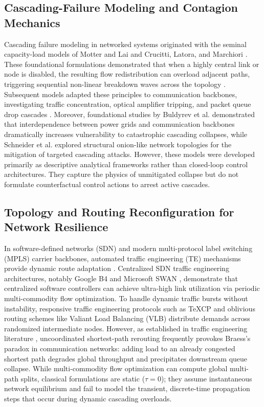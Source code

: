 \documentclass[pdflatex,sn-mathphys-num]{sn-jnl}
\theoremstyle{thmstyleone}
\theoremstyle{thmstyletwo}
\theoremstyle{thmstylethree}
\begin{document}
\subsection{Cascading-Failure Modeling and Contagion Mechanics}
Cascading failure modeling in networked systems originated with the seminal capacity-load models of Motter and Lai \cite{motter2002cascade} and Crucitti, Latora, and Marchiori \cite{crucitti2004model}. These foundational formulations demonstrated that when a highly central link or node is disabled, the resulting flow redistribution can overload adjacent paths, triggering sequential non-linear breakdown waves across the topology \cite{dobson2007complex,cuadra2015critical}. Subsequent models adapted these principles to communication backbones, investigating traffic concentration, optical amplifier tripping, and packet queue drop cascades \cite{albert2000error}. Moreover, foundational studies by Buldyrev et al. \cite{buldyrev2010catastrophic} demonstrated that interdependence between power grids and communication backbones dramatically increases vulnerability to catastrophic cascading collapses, while Schneider et al. \cite{schneider2011mitigation} explored structural onion-like network topologies for the mitigation of targeted cascading attacks. However, these models were developed primarily as descriptive analytical frameworks rather than closed-loop control architectures. They capture the physics of unmitigated collapse but do not formulate counterfactual control actions to arrest active cascades.

\subsection{Topology and Routing Reconfiguration for Network Resilience}
In software-defined networks (SDN) \cite{mckeown2008openflow} and modern multi-protocol label switching (MPLS) carrier backbones, automated traffic engineering (TE) mechanisms provide dynamic route adaptation \cite{caesar2005bgp,fortz2000internet}. Centralized SDN traffic engineering architectures, notably Google B4 \cite{jain2013b4} and Microsoft SWAN \cite{hong2013achieving}, demonstrate that centralized software controllers can achieve ultra-high link utilization via periodic multi-commodity flow optimization. To handle dynamic traffic bursts without instability, responsive traffic engineering protocols such as TeXCP \cite{kandula2005walking} and oblivious routing schemes like Valiant Load Balancing (VLB) \cite{valiant1982scheme} distribute demands across randomized intermediate nodes. However, as established in traffic engineering literature \cite{roughgarden2002bad}, uncoordinated shortest-path rerouting frequently provokes Braess's paradox in communication networks: adding load to an already congested shortest path degrades global throughput and precipitates downstream queue collapse. While multi-commodity flow optimization \cite{boyd2004convex} can compute global multi-path splits, classical formulations are static ($\tau=0$); they assume instantaneous network equilibrium and fail to model the transient, discrete-time propagation steps that occur during dynamic cascading overloads.
\end{document}

